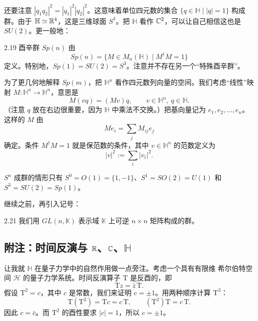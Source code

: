 还要注意 $|q_1q_2|^2=|q_1|^2|q_2|^2$。这意味着单位四元数的集合 $\{q\in\mathbb{H}\mid |q|=1\}$ 构成群。由于 $\mathbb{H}\simeq\mathbb{R}^4$，这是三维球面 $S^3$。把 $\mathbb{H}$ 看作 $\mathbb{C}^2$，可以让自己相信这也是 $SU(2)$。更一般地：

\begin{example}{2.19}
酉辛群 $Sp(n)$ 由
\begin{equation}
Sp(n)=\{M\in M_n(\mathbb{H})\mid M^\dagger M=1\} \tag{2.19}
\end{equation}
定义。特别地，$Sp(1)=SU(2)=S^3$。注意并不存在另一个“特殊酉辛群”。
\end{example}

为了更几何地解释 $Sp(m)$，把 $\mathbb{H}^n$ 看作四元数列向量的空间。我们考虑“线性”映射 $M:\mathbb{H}^n\to\mathbb{H}^n$，意思是
\begin{equation}
M(vq)=(Mv)q,\qquad v\in\mathbb{H}^n,\ q\in\mathbb{H}. \tag{2.20}
\end{equation}
（注意 $q$ 放在右边很重要，因为 $\mathbb{H}$ 中乘法不交换。）把基向量记为 $e_1,e_2,\ldots,e_n$。这样的 $M$ 由
\begin{equation}
Me_i=\sum_j M_{ij}e_j \tag{2.21}
\end{equation}
确定。条件 $M^\dagger M=1$ 就是保范数的条件，其中 $v\in\mathbb{H}^n$ 的范数定义为
\begin{equation}
|v|^2:=\sum_i |v_i|^2. \tag{2.22}
\end{equation}

\begin{qmbox}
$S^n$ 成群的情形只有 $S^0=O(1)=\{1,-1\}$、$S^1=SO(2)=U(1)$ 和 $S^3=SU(2)=Sp(1)$。
\end{qmbox}

继续之前，再引入记号：

\begin{definition}{2.21}
我们用 $GL(n,\mathbb{K})$ 表示域 $\mathbb{K}$ 上可逆 $n\times n$ 矩阵构成的群。
\end{definition}

\subsection{附注：时间反演与 $\mathbb{R}$、$\mathbb{C}$、$\mathbb{H}$}

让我就 $\mathbb{H}$ 在量子力学中的自然作用做一点旁注。考虑一个具有有限维 希尔伯特空间 $\mathcal{H}$ 的量子力学系统。时间反演算子 $\mathrm{T}$ 是反酉的，即
\begin{equation}
\mathrm{T} z=\bar z\,\mathrm{T}. \tag{2.23}
\end{equation}
假设 $\mathrm{T}^2=c$，其中 $c$ 是常数，我们来证明 $c=\pm1$。用两种顺序计算 $\mathrm{T}^3$：
\begin{equation}
\mathrm{T}(\mathrm{T}^2)=\mathrm{T}c=c\,\mathrm{T},\qquad (\mathrm{T}^2)\mathrm{T}=c\,\mathrm{T}. \tag{2.24}
\end{equation}
因此 $c=\bar c$。而 $\mathrm{T}^2$ 的酉性要求 $|c|=1$，所以 $c=\pm1$。

